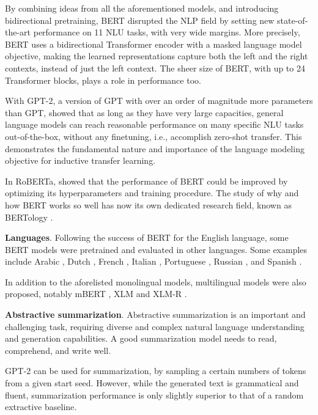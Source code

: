 \documentclass[11pt,a4paper]{article}
\begin{document}
By combining ideas from all the aforementioned models, and introducing bidirectional pretraining, BERT \cite{devlin2018bert} disrupted the NLP field by setting new state-of-the-art performance on 11 NLU tasks, with very wide margins.
More precisely, BERT uses a bidirectional Transformer encoder with a masked language model objective, making the learned representations capture both the left and the right contexts, instead of just the left context.
The sheer size of BERT, with up to 24 Transformer blocks, plays a role in performance too.

With GPT-2, a version of GPT with over an order of magnitude more parameters than GPT, \citet{radford2019language} showed that as long as they have very large capacities, general language models can reach reasonable performance on many specific NLU tasks out-of-the-box, without any finetuning, i.e., accomplish zero-shot transfer.
This demonstrates the fundamental nature and importance of the language modeling objective for inductive transfer learning.

In RoBERTa, \citet{liu2019roberta} showed that the performance of BERT could be improved by optimizing its hyperparameters and training procedure. The study of why and how BERT works so well has now its own dedicated research field, known as BERTology \cite{rogers2020primer}.

\noindent \textbf{Languages}.
Following the success of BERT for the English language, some BERT models were pretrained and evaluated in other languages.
Some examples include Arabic \cite{antoun2020arabert}, Dutch \cite{de2019bertje,delobelle2020robbert}, French \cite{martin2019camembert,le2019flaubert}, Italian \cite{polignano2019alberto}, Portuguese \cite{souza2019portuguese}, Russian \cite{kuratov2019adaptation}, and Spanish \cite{CaneteCFP2020}.

In addition to the aforelisted monolingual models, multilingual models were also proposed, notably mBERT \cite{devlin2018bert}, XLM \cite{lample2019cross} and XLM-R \cite{conneau2019unsupervised}.

\noindent \textbf{Abstractive summarization}.
Abstractive summarization is an important and challenging task, requiring diverse and complex natural language understanding and generation capabilities.
A good summarization model needs to read, comprehend, and write well.

GPT-2 can be used for summarization, by sampling a certain numbers of tokens from a given start seed.
However, while the generated text is grammatical and fluent, summarization performance is only slightly superior to that of a random extractive baseline.
\end{document}
